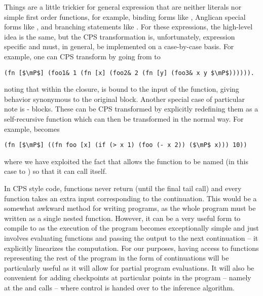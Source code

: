 Things are a little
trickier for general expression that are neither literals nor simple first order functions, for example,
binding forms like , Anglican special forms like \sample, and branching statements like .
For these expressions, the high-level idea is the same, but the CPS transformation is, unfortunately, 
expression specific and must, in general, be implemented on a case-by-case basis.  
For example, one can CPS transform  by going from
 to
 \begin{lstlisting}[basicstyle=\ttfamily\small,frame=none]
 (fn [$\mP$] (foo1& 1 (fn [x] (foo2& 2 (fn [y] (foo3& x y $\mP$)))))).
 \end{lstlisting}\vspace{-8pt}
noting that within the  closure,  is bound to the input of the 
function, giving behavior synonymous to the original
 block.  
Another special case of particular note is - blocks.  These can be CPS
transformed by explicitly redefining them as a self-recursive function which can then
be transformed in the normal way.  For example,
becomes
\begin{lstlisting}[basicstyle=\ttfamily\small,frame=none]
 (fn [$\mP$] ((fn foo [x] (if (> x 1) (foo (- x 2)) ($\mP$ x))) 10))
 \end{lstlisting}\vspace{-8pt}
where we have exploited the fact that  allows the function to be named (in this case to
) so that it can call itself.
 
In CPS style code, functions never return (until the final tail call) and every function takes an
extra input corresponding to the continuation.  This would be a somewhat awkward method for
writing programs, as the whole program must be written as a single nested function.  However,
it can be a very useful form to compile to as the execution of the program becomes
exceptionally simple and just involves evaluating functions and passing the output to the
next continuation -- it explicitly linearizes the computation.  For our purposes, having access
to functions representing the rest of the program in the form of continuations will be
particularly useful as it will allow for partial program evaluations.  It will also be convenient
for adding checkpoints at particular points in the program -- namely at the \sample and
\observe calls -- where control is handed over to the inference algorithm.

